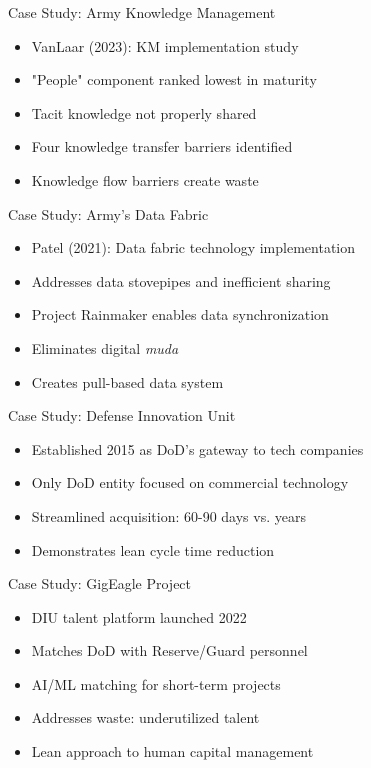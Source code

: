 \documentclass[aspectratio=169,11pt,xcolor={dvipsnames},hyperref={pdftex,pdfpagemode=UseNone,hidelinks,pdfdisplaydoctitle=true},usepdftitle=false]{beamer}
\begin{document}
    \begin{frame}{Case Study: Army Knowledge Management}
      \begin{itemize}
        \item VanLaar (2023): KM implementation study
        \item "People" component ranked lowest in maturity
        \item Tacit knowledge not properly shared
        \item Four knowledge transfer barriers identified
        \item Knowledge flow barriers create waste
      \end{itemize}
    \end{frame}

    \begin{frame}{Case Study: Army's Data Fabric}
      \begin{itemize}
        \item Patel (2021): Data fabric technology implementation
        \item Addresses data stovepipes and inefficient sharing
        \item Project Rainmaker enables data synchronization
        \item Eliminates digital \textit{muda}
        \item Creates pull-based data system
      \end{itemize}
    \end{frame}

    \begin{frame}{Case Study: Defense Innovation Unit}
      \begin{itemize}
        \item Established 2015 as DoD's gateway to tech companies
        \item Only DoD entity focused on commercial technology
        \item Streamlined acquisition: 60-90 days vs. years
        \item Demonstrates lean cycle time reduction
      \end{itemize}
    \end{frame}

    \begin{frame}{Case Study: GigEagle Project}
      \begin{itemize}
        \item DIU talent platform launched 2022
        \item Matches DoD with Reserve/Guard personnel
        \item AI/ML matching for short-term projects
        \item Addresses waste: underutilized talent
        \item Lean approach to human capital management
      \end{itemize}
    \end{frame}
\end{document}
